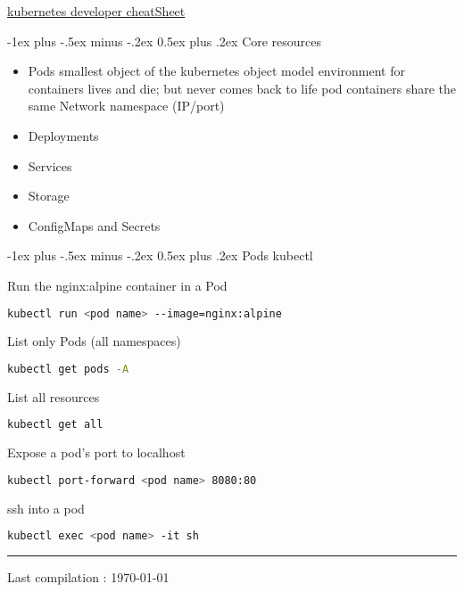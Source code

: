 \documentclass[11pt, landscape]{article}
\makeatletter
\renewcommand{\section}{\@startsection{section}{1}{0mm}%
{-1ex plus -.5ex minus -.2ex}%
{0.5ex plus .2ex}%
{\normalfont\large\bfseries}}
\makeatother
\begin{document}
\raggedright
\footnotesize
\begin{multicols}{2}

	\setlength{\premulticols}{1pt}
	\setlength{\postmulticols}{1pt}
	\setlength{\multicolsep}{1pt}
	\setlength{\columnsep}{2pt}

	\begin{center}
		\Large{\underline{kubernetes developer cheatSheet}} \\
	\end{center}

	\section {Core resources}
	\begin {itemize}
	\item Pods
	\subitem smallest object of the kubernetes object model
	\subitem environment for containers
	\subitem lives and die; but never comes back to life
	\subitem pod containers share the same Network namespace
	(IP/port)
	\item Deployments
	\item Services
	\item Storage
	\item ConfigMaps and Secrets
	\end {itemize}

	\section {Pods kubectl}

	\noindent Run the nginx:alpine container in a Pod
	\begin{lstlisting}[language=bash]
		kubectl run <pod name> --image=nginx:alpine
		\end{lstlisting}

	\noindent List only Pods (all namespaces)
	\begin{lstlisting}[language=bash]
		kubectl get pods -A
	\end{lstlisting}

	\noindent List all resources
	\begin{lstlisting}[language=bash]
		kubectl get all
	\end{lstlisting}
	
	\noindent Expose a pod's port to localhost
	\begin{lstlisting}[language=bash]
		kubectl port-forward <pod name> 8080:80
	\end{lstlisting}

	\noindent ssh into a pod
	\begin{lstlisting}[language=bash]
		kubectl exec <pod name> -it sh
	\end{lstlisting}

	\rule{0.3\linewidth}{0.25pt}
	\scriptsize

	Last compilation : \today
\end{multicols}
\end{document}

